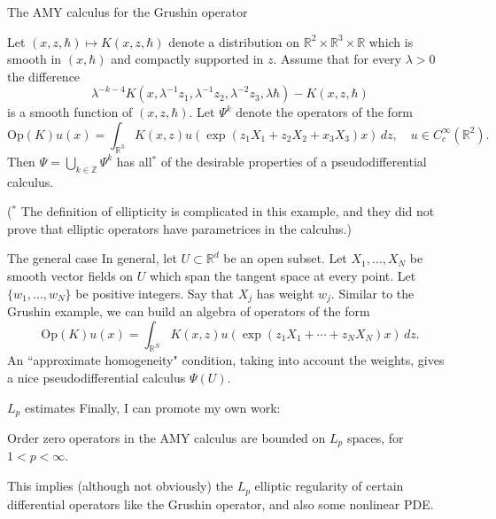 \documentclass{beamer}
\numberwithin{equation}{section}
\theoremstyle{plain}
\theoremstyle{plain}
\theoremstyle{definition}
\theoremstyle{plain}
\theoremstyle{plain}
\theoremstyle{definition}
\newcommand{\Rl}{\mathbb{R}}
\newcommand{\Itgr}{\mathbb{Z}}
\newcommand{\Op}{\mathrm{Op}}
\begin{document}
\begin{frame}{The AMY calculus for the Grushin operator}
\begin{theorem}
    Let $(x,z,\hbar)\mapsto K(x,z,\hbar)$ denote a distribution on $\Rl^2\times\Rl^3\times \Rl$ which is smooth in $(x,\hbar)$ and compactly supported in $z.$ Assume that for every $\lambda>0$ the difference
    \[
        \lambda^{-k-4}K(x,\lambda^{-1}z_1,\lambda^{-1}z_2,\lambda^{-2}z_3,\lambda\hbar)-K(x,z,\hbar)
    \]
    is a smooth function of $(x,z,\hbar).$ Let $\Psi^k$ denote the operators of the form 
    \[
        \Op(K)u(x) = \int_{\Rl^3} K(x,z)u(\exp(z_1X_1+z_2X_2+x_3X_3)x)\,dz,\quad u\in C^\infty_c(\Rl^2).
    \]
    Then $\Psi = \bigcup_{k\in \Itgr} \Psi^k$ has all$^*$ of the desirable properties of a pseudodifferential calculus.
\end{theorem}
\pause
($^*$ The definition of ellipticity is complicated in this example, and they did not prove that elliptic operators have parametrices in the calculus.)
\end{frame}

\begin{frame}{The general case}
    In general, let $U\subset \Rl^d$ be an open subset. Let $X_1,\ldots,X_N$ be smooth vector fields on $U$ which span the tangent space at every point. Let $\{w_1,\ldots,w_N\}$ be positive integers. Say that $X_j$ has weight $w_j.$ 
    \pause
    Similar to the Grushin example, we can build an algebra of operators of the form
    \[
        \Op(K)u(x) = \int_{\Rl^N} K(x,z)u(\exp(z_1X_1+\cdots+z_NX_N)x)\,dz.
    \]
    An ``approximate homogeneity" condition, taking into account the weights, gives a nice pseudodifferential calculus $\Psi(U).$
\end{frame}

\begin{frame}{$L_p$ estimates}
    Finally, I can promote my own work:
    \begin{theorem}[M. (2024)]
        Order zero operators in the AMY calculus are bounded on $L_p$ spaces, for $1<p<\infty.$
    \end{theorem}
    This implies (although not obviously) the $L_p$ elliptic regularity of certain differential operators like the Grushin operator, and also some nonlinear PDE.
\end{frame}




\begin{frame}
\end{frame}
\end{document}
